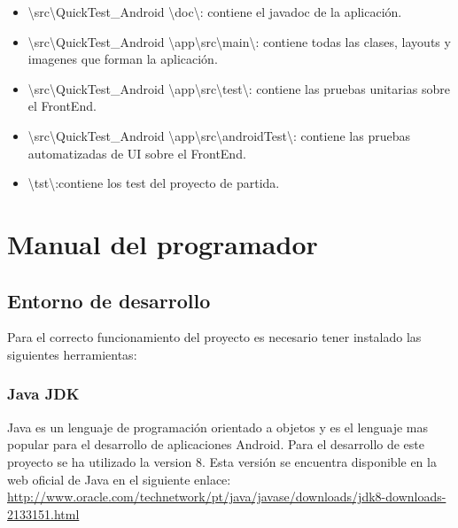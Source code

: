 \begin{itemize}
	\item \textbackslash{}src\textbackslash{}QuickTest\_Android		\textbackslash{}doc\textbackslash{}: contiene el javadoc de la aplicación.
	
	\item \textbackslash{}src\textbackslash{}QuickTest\_Android		\textbackslash{}app\textbackslash{}src\textbackslash{}main\textbackslash{}: contiene todas las clases, layouts y imagenes que forman la aplicación.
	
	\item \textbackslash{}src\textbackslash{}QuickTest\_Android		\textbackslash{}app\textbackslash{}src\textbackslash{}test\textbackslash{}: contiene las pruebas unitarias sobre el FrontEnd.
	
	\item \textbackslash{}src\textbackslash{}QuickTest\_Android		\textbackslash{}app\textbackslash{}src\textbackslash{}androidTest\textbackslash{}: contiene las pruebas automatizadas de UI sobre el FrontEnd.
	
	\item \textbackslash{}tst\textbackslash{}:contiene los test del proyecto de partida.
	
	
	
\end{itemize}

\section{Manual del programador}

\subsection{Entorno de desarrollo}\label{subsec:RequisitosMinimos}

Para el correcto funcionamiento del proyecto es necesario tener instalado las siguientes herramientas:

\subsubsection{Java JDK}

Java es un lenguaje de programación orientado a objetos y es el lenguaje mas popular para el desarrollo de aplicaciones Android. Para el desarrollo de este proyecto se ha utilizado la version 8. Esta versión se encuentra disponible en la web oficial de Java en el siguiente enlace: \url{http://www.oracle.com/technetwork/pt/java/javase/downloads/jdk8-downloads-2133151.html}

